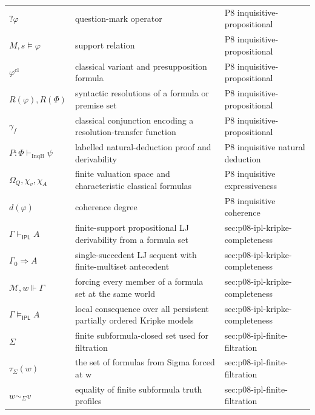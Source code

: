 \begin{longtable}{@{}p{}p{}p{}@{}}
\(?\varphi\) & question-mark operator & P8 inquisitive-\allowbreak{}propositional \\
\(M,\allowbreak s\models\varphi\) & support relation & P8 inquisitive-\allowbreak{}propositional \\
\(\varphi^{\mathrm{cl}}\) & classical variant and presupposition formula & P8 inquisitive-\allowbreak{}propositional \\
\(R(\varphi),\allowbreak R(\Phi)\) & syntactic resolutions of a formula or premise set & P8 inquisitive-\allowbreak{}propositional \\
\(\gamma_f\) & classical conjunction encoding a resolution-transfer function & P8 inquisitive-\allowbreak{}propositional \\
\(P:\Phi\vdash_{\mathrm{InqB}}\psi\) & labelled natural-deduction proof and derivability & P8 inquisitive natural deduction \\
\(\Omega_Q,\allowbreak \chi_v,\allowbreak \chi_A\) & finite valuation space and characteristic classical formulas & P8 inquisitive expressiveness \\
\(d(\varphi)\) & coherence degree & P8 inquisitive coherence \\
\(\Gamma\vdash_{\mathsf{IPL}}A\) & finite-support propositional LJ derivability from a formula set & sec:\allowbreak{}p08-\allowbreak{}ipl-\allowbreak{}kripke-\allowbreak{}completeness \\
\(\Gamma_0\Rightarrow A\) & single-succedent LJ sequent with finite-multiset antecedent & sec:\allowbreak{}p08-\allowbreak{}ipl-\allowbreak{}kripke-\allowbreak{}completeness \\
\(\mathcal M,\allowbreak w\Vdash\Gamma\) & forcing every member of a formula set at the same world & sec:\allowbreak{}p08-\allowbreak{}ipl-\allowbreak{}kripke-\allowbreak{}completeness \\
\(\Gamma\models_{\mathsf{IPL}}A\) & local consequence over all persistent partially ordered Kripke models & sec:\allowbreak{}p08-\allowbreak{}ipl-\allowbreak{}kripke-\allowbreak{}completeness \\
\(\Sigma\) & finite subformula-closed set used for filtration & sec:\allowbreak{}p08-\allowbreak{}ipl-\allowbreak{}finite-\allowbreak{}filtration \\
\(\tau_\Sigma(w)\) & the set of formulas from Sigma forced at w & sec:\allowbreak{}p08-\allowbreak{}ipl-\allowbreak{}finite-\allowbreak{}filtration \\
\(w\sim_\Sigma v\) & equality of finite subformula truth profiles & sec:\allowbreak{}p08-\allowbreak{}ipl-\allowbreak{}finite-\allowbreak{}filtration \\

\end{longtable}
